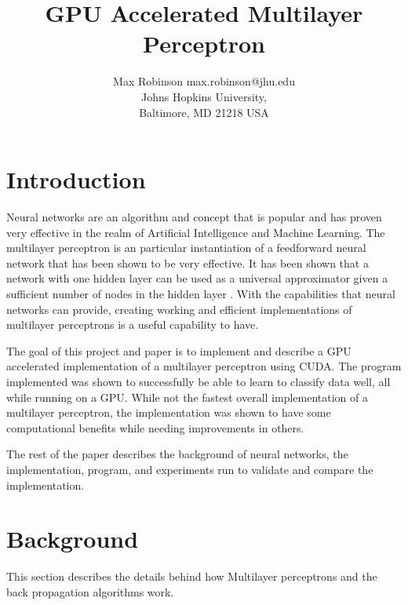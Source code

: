 \documentclass[jair, twoside,11pt,theapa]{article}
\begin{document}
\title{GPU Accelerated Multilayer Perceptron}
\author{\name Max Robinson \email max.robinson@jhu.edu \\
       \addr Johns Hopkins University,\\
       Baltimore, MD 21218 USA
}

\maketitle


\section{Introduction}
\label{Introduction}
Neural networks are an algorithm and concept that is popular and has proven very effective in the realm of Artificial Intelligence and Machine Learning. 
The multilayer perceptron is an particular instantiation of a feedforward neural network that has been shown to be very effective. 
It has been shown that a network with one hidden layer can be used as a universal approximator given a sufficient number of nodes in the hidden layer \cite{MLFFNetworks}.
With the capabilities that neural networks can provide, creating working and efficient implementations of multilayer perceptrons is a useful capability to have. 

The goal of this project and paper is to implement and describe a GPU accelerated implementation of a multilayer perceptron using CUDA. 
The program implemented was shown to successfully be able to learn to classify data well, all while running on a GPU. 
While not the fastest overall implementation of a multilayer perceptron, the implementation was shown to have some computational benefits while needing improvements in others. 

The rest of the paper describes the background of neural networks, the implementation, program, and experiments run to validate and compare the implementation. 


\section{Background}
\label{Background}
This section describes the details behind how Multilayer perceptrons and the back propagation algorithms work. 
\end{document}
